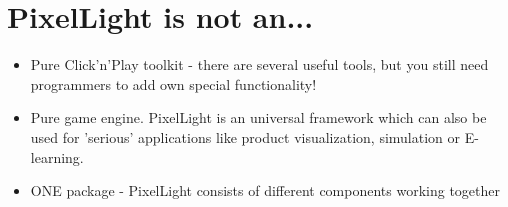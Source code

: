 \section{PixelLight is not an...}
\begin{itemize}
\item{Pure Click'n'Play toolkit - there are several useful tools, but you still need programmers to add own special functionality!}
\item{Pure game engine. PixelLight is an universal framework which can also be used for 'serious' applications like product visualization, simulation or E-learning.}
\item{ONE package - PixelLight consists of different components working together}
\end{itemize}





